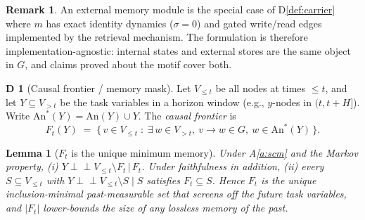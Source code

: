 \documentclass[11pt]{article}
\newcommand{\indep}{\perp\!\!\!\perp}
\newcommand{\An}{\mathrm{An}}
\newcommand{\past}{V_{\le t}}
\newcommand{\future}{V_{> t}}
\theoremstyle{plain}
\newtheorem{lemma}{Lemma}
\theoremstyle{definition}
\newtheorem{definitionx}{D}
\newtheorem{remark}{Remark}
\begin{document}
\begin{remark}\label{rem:external}
An external memory module is the special case of D\ref{def:carrier} where $m$ has exact identity dynamics ($\sigma = 0$) and gated write/read edges implemented by the retrieval mechanism. The formulation is therefore implementation-agnostic: internal states and external stores are the same object in $G$, and claims proved about the motif cover both.
\end{remark}

\begin{definitionx}[Causal frontier / memory mask]\label{def:frontier}
Let $\past$ be all nodes at times $\le t$, and let $Y \subseteq \future$ be the task variables in a horizon window (e.g., $y$-nodes in $(t, t+H]$). Write $\An^*(Y) = \An(Y) \cup Y$. The \emph{causal frontier} is
\[
F_t(Y) \;=\; \big\{\, v \in \past \;:\; \exists\, w \in \future,\ v \to w \in G,\ w \in \An^*(Y) \,\big\}.
\]
\end{definitionx}

\begin{lemma}[$F_t$ is the unique minimum memory]\label{lem:frontier}
Under A\ref{a:scm} and the Markov property, \emph{(i)} $Y \indep \past \setminus F_t \,\big|\, F_t$. Under faithfulness in addition, \emph{(ii)} every $S \subseteq \past$ with $Y \indep \past \setminus S \mid S$ satisfies $F_t \subseteq S$. Hence $F_t$ is the unique inclusion-minimal past-measurable set that screens off the future task variables, and $|F_t|$ lower-bounds the size of any lossless memory of the past.
\end{lemma}
\end{document}
